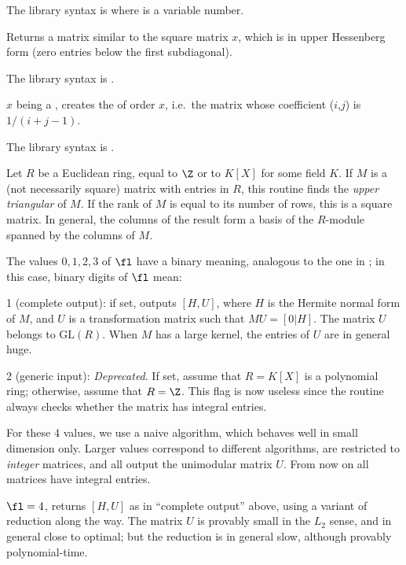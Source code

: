 The library syntax is  where  is a variable number.

\label{se:mathess}
Returns a matrix similar to the square matrix $x$, which is in upper Hessenberg
form (zero entries below the first subdiagonal).

The library syntax is .

\label{se:mathilbert}
$x$ being a , creates the
of order $x$, i.e.~the matrix whose coefficient
($i$,$j$) is $1/ (i+j-1)$.

The library syntax is .

\label{se:mathnf}
Let $R$ be a Euclidean ring, equal to $\Z$ or to $K[X]$ for some field
$K$. If $M$ is a (not necessarily square) matrix with entries in $R$, this
routine finds the \emph{upper triangular}  of $M$.
If the rank of $M$ is equal to its number of rows, this is a square
matrix. In general, the columns of the result form a basis of the $R$-module
spanned by the columns of $M$.

The values $0,1,2,3$ of $\fl$ have a binary meaning, analogous to the one
in ; in this case, binary digits of $\fl$ mean:

\item 1 (complete output): if set, outputs $[H,U]$, where $H$ is the Hermite
normal form of $M$, and $U$ is a transformation matrix such that $MU=[0|H]$.
The matrix $U$ belongs to $\text{GL}(R)$. When $M$ has a large kernel, the
entries of $U$ are in general huge.

\item 2 (generic input): \emph{Deprecated}. If set, assume that $R = K[X]$ is
a polynomial ring; otherwise, assume that $R = \Z$. This flag is now useless
since the routine always checks whether the matrix has integral entries.

\noindent For these 4 values, we use a naive algorithm, which behaves well
in small dimension only. Larger values correspond to different algorithms,
are restricted to \emph{integer} matrices, and all output the unimodular
matrix $U$. From now on all matrices have integral entries.

\item $\fl=4$, returns $[H,U]$ as in ``complete output'' above, using a
variant of  reduction along the way. The matrix $U$ is provably
small in the $L_2$ sense, and in general close to optimal; but the
reduction is in general slow, although provably polynomial-time.

